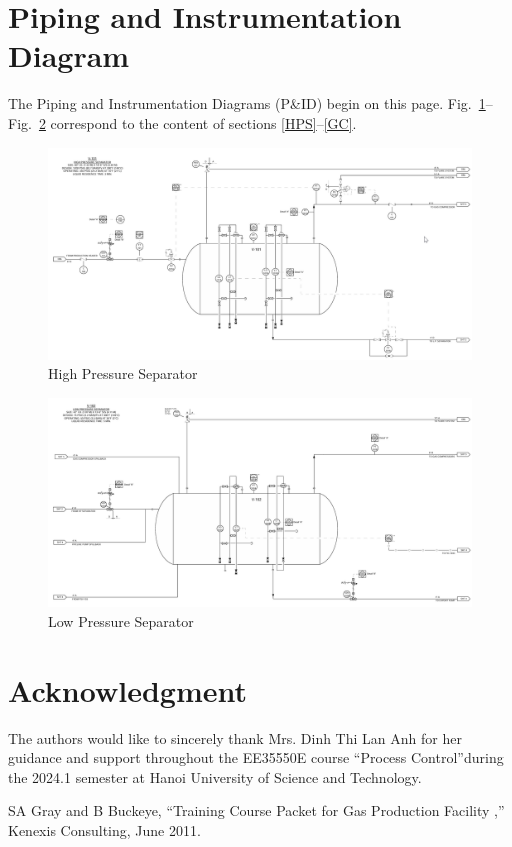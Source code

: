 \documentclass[conference]{IEEEtran}
\begin{document}
\section{Piping and Instrumentation Diagram}
The Piping and Instrumentation Diagrams (P\&ID) begin on this page. Fig.~\ref{fig:HPS}--Fig.~\ref{fig:LPS} correspond to the content of sections \ref{HPS}--\ref{GC}.

\begin{figure}
    \centering
    \includegraphics[width=\textwidth]{high_pressure_separator.png}
    \caption{High Pressure Separator}
    \label{fig:HPS}
\end{figure}

\begin{figure}[htbp]
    \centering
    \includegraphics[width=\textwidth]{low_pressure_separator.png}
    \caption{Low Pressure Separator}
    \label{fig:LPS}
\end{figure}


\section*{Acknowledgment}

The authors would like to sincerely thank Mrs. Dinh Thi Lan Anh for her guidance and support throughout the EE35550E course ``Process Control''during the 2024.1 semester at Hanoi University of Science and Technology.

\begin{thebibliography}{00}
     SA Gray and B Buckeye, ``Training Course Packet for Gas Production Facility ,'' Kenexis Consulting, June 2011.

\end{thebibliography}
\end{document}

